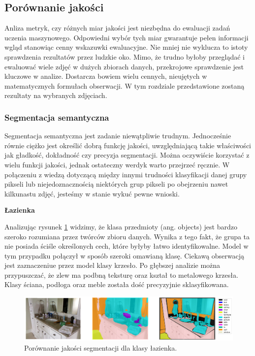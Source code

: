 \subsection{Porównanie jakości}
Anliza metryk, czy różnych miar jakości jest niezbędna do ewaluacji zadań uczenia maszynowego. Odpowiedni wybór tych miar gwarantuje pełen informacji wgląd stanowiąc cenny wskazuwki ewaluacyjne. Nie mniej nie wyklucza to istoty sprawdzenia rezultatów przez ludzkie oko. Mimo, że trudno byłoby przeglądać i ewaluować wiele zdjęć w dużych zbiorach danych, przekrojowe sprawdzenie jest kluczowe w analize. Dostarcza bowiem wielu cennych, nieujętych w matematycznych formułach obserwacji. W tym rozdziale przedstawione zostaną rezultaty na wybranych zdjęciach.
\subsubsection{Segmentacja semantyczna}
Segmentacja semantyczna jest zadanie niewątpliwie trudnym. Jednocześnie równie ciężko jest określić dobrą funkcję jakości, uwzględniającą takie właściwości jak gładkość, dokładność czy precyzja segmentacji. Można oczywiście korzystać z wielu funkcji jakości, jednak ostateczny werdyk warto przejrzeć ręcznie. W połączeniu z wiedzą dotyczącą między innymi trudności klasyfikacji danej grupy pikseli lub niejedoznacznością niektórych grup pikseli po obejrzeniu nawet kilkunastu zdjęć, jesteśmy w stanie wykuć pewne wnioski. 

\noindent
\textbf{Łazienka}

Analizując rysunek \ref{fig:bathroom-pred-1} widzimy, że klasa przedmioty (ang. objects) jest bardzo szeroko rozumiana przez twórców zbioru danych. Wynika z tego fakt, że grupa ta nie posiada ściśle określonych cech, które byłyby łatwo identyfikowalne. Model w tym przypadku połączył w sposób szeroki omawianą klasę. Ciekawą obserwacją jest zaznaczeniue przez model klasy krzesło. Po głębszej analizie można przypuszczać, że zlew ma podbną teksturę oraz kształ to metalowego krzesła. Klasy ściana, podłoga oraz meble została dość precyzyjnie sklasyfikowana.


\begin{figure}[ht!]
    \centering
    \includegraphics[width=\textwidth]{img/preds_analysis/gt_vs_pred/bathroom-1.png}
    \caption{Porównanie jakości segmentacji dla klasy łazienka.}
    \label{fig:bathroom-pred-1}
\end{figure}

